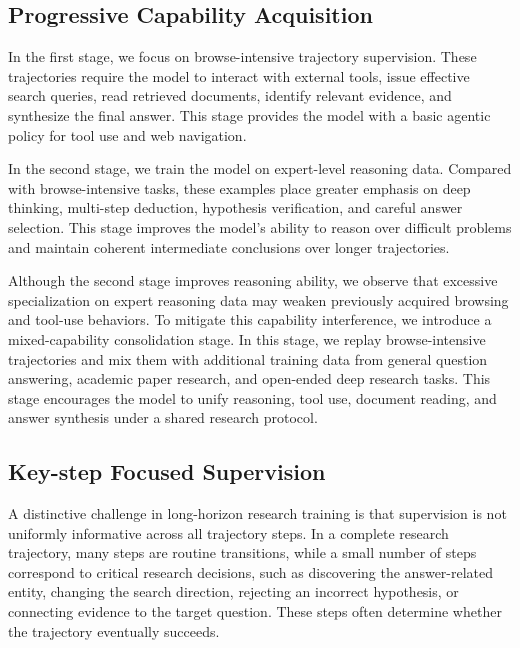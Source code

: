 \documentclass[]{selfevolagent}
\theoremstyle{plain}
\theoremstyle{definition}
\theoremstyle{remark}
\begin{document}
\subsection{Progressive Capability Acquisition}

In the first stage, we focus on browse-intensive trajectory supervision. These trajectories require the model to interact with external tools, issue effective search queries, read retrieved documents, identify relevant evidence, and synthesize the final answer. This stage provides the model with a basic agentic policy for tool use and web navigation.

In the second stage, we train the model on expert-level reasoning data. Compared with browse-intensive tasks, these examples place greater emphasis on deep thinking, multi-step deduction, hypothesis verification, and careful answer selection. This stage improves the model's ability to reason over difficult problems and maintain coherent intermediate conclusions over longer trajectories.

Although the second stage improves reasoning ability, we observe that excessive specialization on expert reasoning data may weaken previously acquired browsing and tool-use behaviors. To mitigate this capability interference, we introduce a mixed-capability consolidation stage. In this stage, we replay browse-intensive trajectories and mix them with additional training data from general question answering, academic paper research, and open-ended deep research tasks. This stage encourages the model to unify reasoning, tool use, document reading, and answer synthesis under a shared research protocol.

\subsection{Key-step Focused Supervision}

A distinctive challenge in long-horizon research training is that supervision is not uniformly informative across all trajectory steps. In a complete research trajectory, many steps are routine transitions, while a small number of steps correspond to critical research decisions, such as discovering the answer-related entity, changing the search direction, rejecting an incorrect hypothesis, or connecting evidence to the target question. These steps often determine whether the trajectory eventually succeeds.
\end{document}

